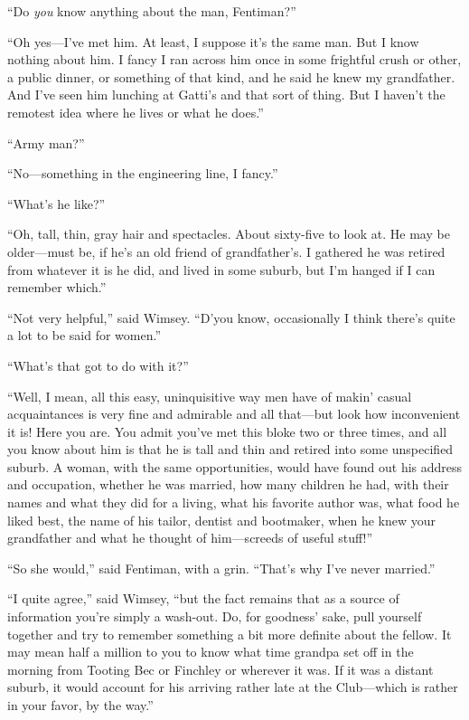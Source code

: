 \enquote{Do \textit{you} know anything about the man, Fentiman?}

\enquote{Oh yes\allowbreak---\allowbreak I've met him. At least, I suppose it's the same man. But I know nothing about him. I fancy I ran across him once in some frightful crush or other, a public dinner, or something of that kind, and he said he knew my grandfather. And I've seen him lunching at Gatti's and that sort of thing. But I haven't the remotest idea where he lives or what he does.}

\enquote{Army man?}

\enquote{No\allowbreak---\allowbreak something in the engineering line, I fancy.}

\enquote{What's he like?}

\enquote{Oh, tall, thin, gray hair and spectacles. About sixty-five to look at. He may be older\allowbreak---\allowbreak must be, if he's an old friend of grandfather's. I gathered he was retired from whatever it is he did, and lived in some suburb, but I'm hanged if I can remember which.}

\enquote{Not very helpful,} said Wimsey. \enquote{D'you know, occasionally I think there's quite a lot to be said for women.}

\enquote{What's that got to do with it?}

\enquote{Well, I mean, all this easy, uninquisitive way men have of makin' casual acquaintances is very fine and admirable and all that\allowbreak---\allowbreak but look how inconvenient it is! Here you are. You admit you've met this bloke two or three times, and all you know about him is that he is tall and thin and retired into some unspecified suburb. A woman, with the same opportunities, would have found out his address and occupation, whether he was married, how many children he had, with their names and what they did for a living, what his favorite author was, what food he liked best, the name of his tailor, dentist and bootmaker, when he knew your grandfather and what he thought of him\allowbreak---\allowbreak screeds of useful stuff!}

\enquote{So she would,} said Fentiman, with a grin. \enquote{That's why I've never married.}

\enquote{I quite agree,} said Wimsey, \enquote{but the fact remains that as a source of information you're simply a wash-out. Do, for goodness' sake, pull yourself together and try to remember something a bit more definite about the fellow. It may mean half a million to you to know what time grandpa set off in the morning from Tooting Bec or Finchley or wherever it was. If it was a distant suburb, it would account for his arriving rather late at the Club\allowbreak---\allowbreak which is rather in your favor, by the way.}

